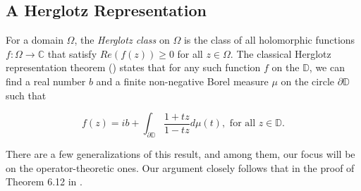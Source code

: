 \documentclass[12pt]{amsart}
\theoremstyle{definition}
\numberwithin{equation}{section}
\newcommand{\D}{\mathbb{D}}
\begin{document}
\subsection{A Herglotz Representation}

For a domain $\Omega$, the \textit{Herglotz class} on $\Omega$ is the class of all holomorphic functions $f:\Omega\rightarrow \mathbb{C}$ that satisfy $Re(f(z))\geq 0$ for all $z\in \Omega$. The classical Herglotz representation theorem (\cite{Herglotz}) states that for any such function $f$ on the $\D$, we can find a real number $b$ and a finite
non-negative Borel measure $\mu$ on the circle $\partial\D$ such that

$$f(z)=ib+\int_{\partial\D} \frac{1+tz}{1-tz}d\mu(t),\,\,\text{for all}\,\,z\in \D.$$

There are a few generalizations of this result, and among them, our focus will be on the operator-theoretic ones.  Our argument closely follows that in the proof of Theorem 6.12 in \cite{AglerMcCYouBook}.
\end{document}
